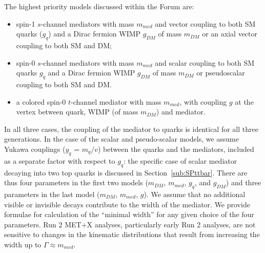 \documentclass[a4,debug,notitlepage,nobib]{tufte-handout}
\begin{document}
The highest priority models discussed within the Forum are:
\begin{itemize}
\item spin-1 $s$-channel mediators with mass $m_{med}$ and vector coupling to both SM quarks  ($g_q$) and a Dirac fermion WIMP $g_{DM}$ of mass $m_{DM}$ or an axial vector coupling to both SM and DM;
\item spin-0 $s$-channel mediators with mass $m_{med}$ and scalar coupling to both SM quarks $g_q$ and a 
Dirac fermion WIMP $g_{DM}$ of mass $m_{DM}$ or pseudoscalar coupling to both SM and DM. 
\item a colored spin-0 $t$-channel mediator with mass $m_{med}$, with 
coupling $g$ at the vertex between quark, WIMP (of mass $m_{DM}$) and mediator. 
\end{itemize}
In all three cases, the coupling of the mediator to quarks is identical for all three
generations. In the case of the scalar and pseudo-scalar 
models, we assume Yukawa couplings ($y_q$ = $m_q/v$) between the quarks and the
mediators, included as a separate factor with respect to $g_q$:
the specific case of scalar mediator decaying into two top quarks 
is discussed in Section~\ref{sub:SPttbar}. 
There are thus four parameters in the first two
models ($m_{DM}$, $m_{med}$, $g_q$, and $g_{DM}$) and three parameters
in the last model ($m_{DM}$, $m_{med}$, $g$). We assume that no
additional visible or invisible decays contribute to the width of the
mediator. We provide formulae for calculation of the ``minimal
width'' for any given choice of the four parameters. Run 2 MET+X
analyses, particularly early Run 2 analyses, are not sensitive to
changes in the kinematic distributions that result from increasing the
width up to $\Gamma \approx m_{med}$.
\end{document}
